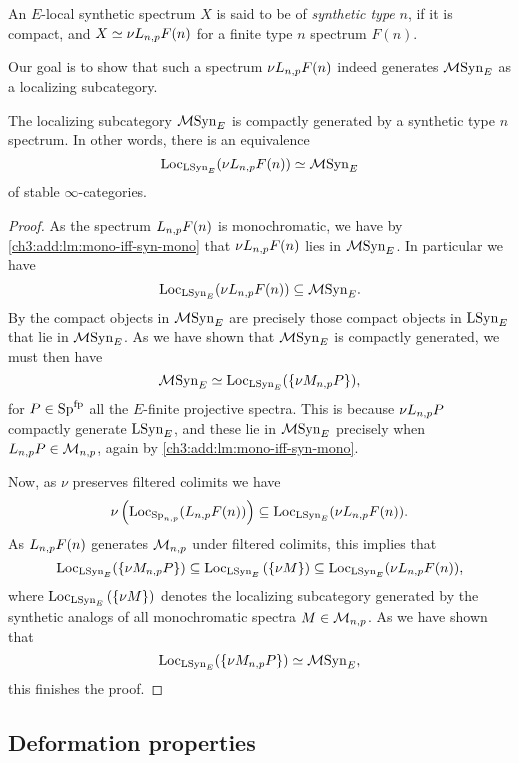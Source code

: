 \begin{definition}
    An $E$-local synthetic spectrum $X$ is said to be of \emph{synthetic type} $n$, if it is compact, and $X\simeq \nu L_{n,p} F(n)$ for a finite type $n$ spectrum $F(n)$. 
\end{definition}

Our goal is to show that such a spectrum $\nu L_{n,p} F(n)$ indeed generates $\mathcal{M}\mathrm{Syn}_{E}$ as a localizing subcategory. 

\begin{lemma}
    \label{ch3:add:monochromatic-synthetic-is-gen-by-type-n}
    The localizing subcategory $\mathcal{M}\mathrm{Syn}_{E}$ is compactly generated by a synthetic type $n$ spectrum. In other words, there is an equivalence 
    \[\operatorname{Loc}_{\mathrm{LSyn}_{E}}(\nu L_{n,p} F(n))\simeq \mathcal{M}\mathrm{Syn}_{E}\]
    of stable $\infty$-categories. 
\end{lemma}
\begin{proof}
    As the spectrum $L_{n,p} F(n)$ is monochromatic, we have by \cref{ch3:add:lm:mono-iff-syn-mono} that $\nu L_{n,p} F(n)$ lies in $\mathcal{M}\mathrm{Syn}_{E}$. In particular we have 
    \[\operatorname{Loc}_{\mathrm{LSyn}_{E}}(\nu L_{n,p} F(n))\subseteq \mathcal{M}\mathrm{Syn}_{E}.\]
    By \cite[2.2]{neeman_1992} the compact objects in $\mathcal{M}\mathrm{Syn}_{E}$ are precisely those compact objects in $\mathrm{LSyn}_{E}$ that lie in $\mathcal{M}\mathrm{Syn}_{E}$. As we have shown that $\mathcal{M}\mathrm{Syn}_{E}$ is compactly generated, we must then have 
    \[\mathcal{M}\mathrm{Syn}_{E} \simeq \operatorname{Loc}_{\mathrm{LSyn}_{E}}(\{\nu M_{n,p} P\}),\]
    for $P \in \mathrm{Sp}^{\mathrm{fp}}$ all the $E$-finite projective spectra. This is because $\nu L_{n,p} P$ compactly generate $\mathrm{LSyn}_{E}$, and these lie in $\mathcal{M}\mathrm{Syn}_{E}$ precisely when $L_{n,p} P\in \mathcal{M}_{n,p}$, again by \cref{ch3:add:lm:mono-iff-syn-mono}. 

    Now, as $\nu$ preserves filtered colimits we have 
    \[\nu \left(\operatorname{Loc}_{\mathrm{Sp}_{n,p}}(L_{n,p} F(n))\right)\subseteq \operatorname{Loc}_{\mathrm{LSyn}_{E}}(\nu L_{n,p} F(n)).\]
    As $L_{n,p} F(n)$ generates $\mathcal{M}_{n,p}$ under filtered colimits, this implies that 
    \[\operatorname{Loc}_{\mathrm{LSyn}_{E}}(\{\nu M_{n,p} P\})\subseteq \operatorname{Loc}_{\mathrm{LSyn}_{E}}\left(\{\nu M\}\right) \subseteq \operatorname{Loc}_{\mathrm{LSyn}_{E}}(\nu L_{n,p} F(n)),\]
    where $\operatorname{Loc}_{\mathrm{LSyn}_{E}}\left(\{\nu M\}\right)$ denotes the localizing subcategory generated by the synthetic analogs of all monochromatic spectra $M\in \mathcal{M}_{n,p}$. As we have shown that 
    \[\operatorname{Loc}_{\mathrm{LSyn}_{E}}(\{\nu M_{n,p} P\})\simeq \mathcal{M}\mathrm{Syn}_{E},\] 
    this finishes the proof. 
\end{proof}



\subsection{Deformation properties}

